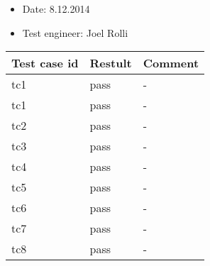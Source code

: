 	\begin{itemize}
	\item Date: 8.12.2014
	\item Test engineer: Joel Rolli 
	\end{itemize}	


	\begin{tabular}{ | p{3cm} | p{3cm} | p{3cm} |}
	\hline
	\textbf{Test case id} 					& \textbf{Restult} & \textbf{Comment} 		\\ 	\hline
	tc1 & pass & - \\ \hline	
	tc1 & pass & - \\ \hline	
	tc2 & pass & - \\ \hline	
	tc3 & pass & - \\ \hline	
	tc4 & pass & - \\ \hline	
	tc5 & pass & - \\ \hline	
	tc6 & pass & - \\ \hline	
	tc7 & pass & - \\ \hline	
	tc8 & pass & - \\ \hline	
	\end{tabular} \\